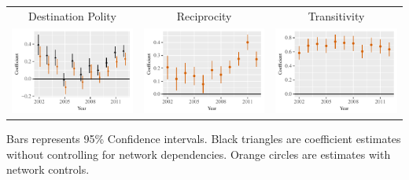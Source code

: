 \documentclass[landscape,a0paper,fontscale=0.285]{baposter} %
\begin{document}
\begin{poster}
{\begin{tabular}{c@{\hskip -.1cm}c@{\hskip -.1cm}c@{\hskip -.1cm}}
Destination Polity & Reciprocity & Transitivity \\ 
\includegraphics[height=.14\textheight, clip=true, trim=.5cm .5cm 0cm .1cm]{figures/rl_plots/DestPolity.pdf} 
 &
\includegraphics[height=.14\textheight, clip=true, trim=.5cm .5cm 0cm .1cm]{figures/rl_plots/Mutuality.pdf}   &
\includegraphics[height=.14\textheight, clip=true, trim=.5cm .5cm 0cm .1cm]{figures/rl_plots/Transitivity.pdf} \\  
\end{tabular}
\vfill
Bars represents 95\% Confidence intervals. Black triangles are coefficient estimates without controlling for network dependencies. Orange circles are estimates with network controls.

}
\end{poster}
\end{document}
